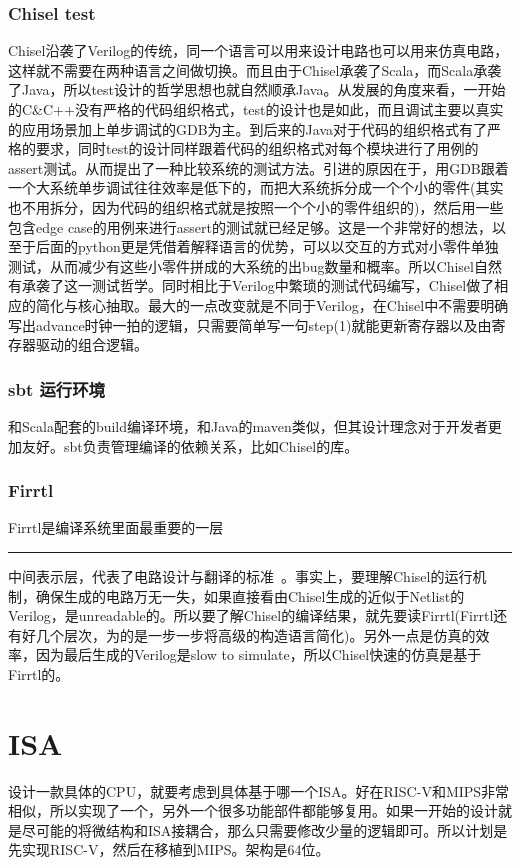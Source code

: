 \documentclass{article}
\newcommand{\chinesedash}{\rule[.7ex]{\widthof{二字}}{0.5pt}}
\begin{document}
	\subsubsection{Chisel test}
	Chisel沿袭了Verilog的传统，同一个语言可以用来设计电路也可以用来仿真电路，这样就不需要在两种语言之间做切换。而且由于Chisel承袭了Scala，而Scala承袭了Java，所以test设计的哲学思想也就自然顺承Java。从发展的角度来看，一开始的C\&C++没有严格的代码组织格式，test的设计也是如此，而且调试主要以真实的应用场景加上单步调试的GDB为主。到后来的Java对于代码的组织格式有了严格的要求，同时test的设计同样跟着代码的组织格式对每个模块进行了用例的assert测试。从而提出了一种比较系统的测试方法。引进的原因在于，用GDB跟着一个大系统单步调试往往效率是低下的，而把大系统拆分成一个个小的零件(其实也不用拆分，因为代码的组织格式就是按照一个个小的零件组织的)，然后用一些包含edge case的用例来进行assert的测试就已经足够。这是一个非常好的想法，以至于后面的python更是凭借着解释语言的优势，可以以交互的方式对小零件单独测试，从而减少有这些小零件拼成的大系统的出bug数量和概率。所以Chisel自然有承袭了这一测试哲学。同时相比于Verilog中繁琐的测试代码编写，Chisel做了相应的简化与核心抽取。最大的一点改变就是不同于Verilog，在Chisel中不需要明确写出advance时钟一拍的逻辑，只需要简单写一句step(1)就能更新寄存器以及由寄存器驱动的组合逻辑。
 	\subsubsection{sbt 运行环境}
 	和Scala配套的build编译环境，和Java的maven类似，但其设计理念对于开发者更加友好。sbt负责管理编译的依赖关系，比如Chisel的库。
	\subsubsection{Firrtl}
	Firrtl是编译系统里面最重要的一层\chinesedash 中间表示层，代表了电路设计与翻译的标准~\cite{firrtl}。事实上，要理解Chisel的运行机制，确保生成的电路万无一失，如果直接看由Chisel生成的近似于Netlist的Verilog，是unreadable的。所以要了解Chisel的编译结果，就先要读Firrtl(Firrtl还有好几个层次，为的是一步一步将高级的构造语言简化)。另外一点是仿真的效率，因为最后生成的Verilog是slow to simulate，所以Chisel快速的仿真是基于Firrtl的。

\section{ISA}
设计一款具体的CPU，就要考虑到具体基于哪一个ISA。好在RISC-V和MIPS非常相似，所以实现了一个，另外一个很多功能部件都能够复用。如果一开始的设计就是尽可能的将微结构和ISA接耦合，那么只需要修改少量的逻辑即可。所以计划是先实现RISC-V，然后在移植到MIPS。架构是64位。
\end{document}
